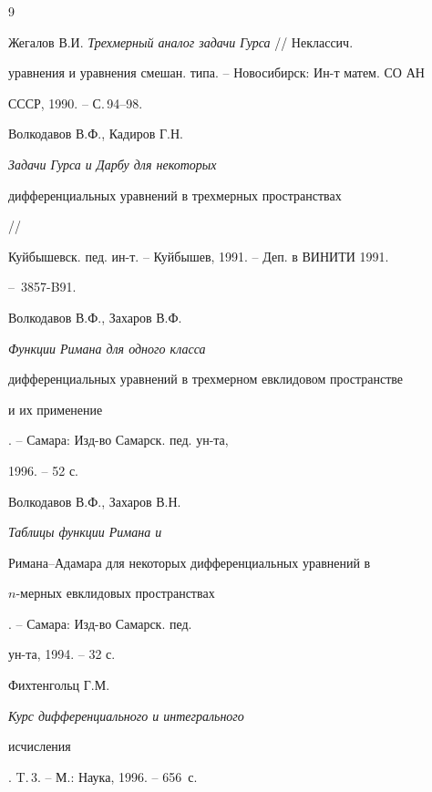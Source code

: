 \begin{thebibliography}{9} 


 




Жегалов В.И. {\em Трехмерный аналог задачи Гурса} // Неклассич. 


уравнения и уравнения смешан. типа. -- Новосибирск: Ин-т матем. СО АН 


СССР, 1990. -- С.\,94--98. 




Волкодавов В.Ф., Кадиров Г.Н. {\em Задачи Гурса и Дарбу для некоторых 


дифференциальных уравнений в трехмерных пространствах} // 


Куйбышевск. пед. ин-т. -- Куйбышев, 1991. -- Деп. в ВИНИТИ 1991. 


-- \No\,3857-B91. 




Волкодавов В.Ф., Захаров В.Ф. {\em Функции Римана для одного класса 


дифференциальных уравнений в трехмерном евклидовом пространстве 


и их применение}. -- Самара: Изд-во Самарск. пед. ун-та, 


1996. -- 52 с. 




Волкодавов В.Ф., Захаров В.Н. {\em Таблицы функции Римана и 


Римана--Адамара для некоторых дифференциальных уравнений в 


$n$-мерных евклидовых пространствах}. -- Самара: Изд-во Самарск. пед. 


ун-та, 1994. -- 32 с. 




Фихтенгольц Г.М. {\em Курс дифференциального и интегрального 


исчисления}. T.\,3. -- М.: Наука, 1996. -- 656~с. 


 


\end{thebibliography} 


 


\vskip 2cm 


 






 


\label{end} 


 


